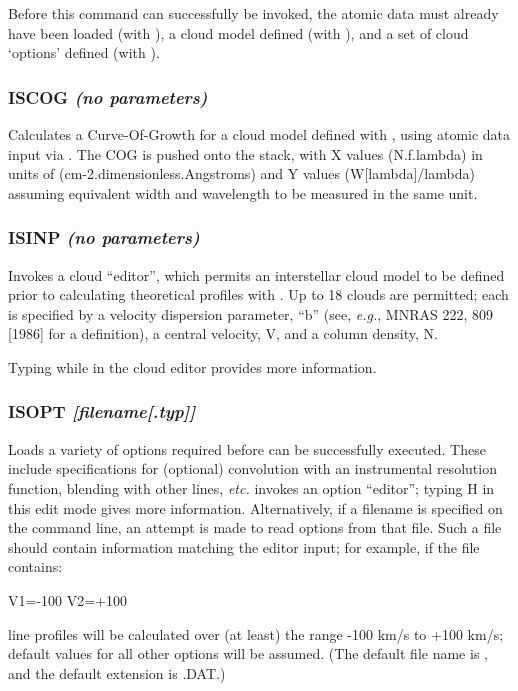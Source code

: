 \documentclass[twoside,11pt,noabs,nolof]{starlink}
\providecommand{\dipcom}[3]{\subsubsection*{\label{COM:#1}\textbf{#1} \emph{#2}}}
\begin{document}
Before this command can successfully be invoked, the atomic data must
already have been loaded (with ),  a cloud model defined (with
),  and a set of cloud `options' defined (with ).

\dipcom{ISCOG}{(no parameters)}{Calculates a Curve-Of-Growth for an interstellar cloud model}
Calculates a Curve-Of-Growth for a cloud model defined with ,
using atomic data input via .  The COG is pushed onto the stack,
with X values (N.f.lambda) in units of (cm-2.dimensionless.Angstroms)
and Y values (W[lambda]/lambda) assuming equivalent width and
wavelength to be measured in the same unit.

\dipcom{ISINP}{(no parameters)}{Sets up an interstellar cloud model}
Invokes a cloud ``editor'', which permits an interstellar cloud model
to be defined prior to calculating theoretical profiles with .
Up to 18 clouds are permitted; each is specified by a velocity
dispersion parameter, ``b'' (see, \emph{e.g.}, MNRAS 222, 809 [1986]
for a definition), a central velocity, V, and a column density, N.

Typing   while in the cloud editor provides more information.

\dipcom{ISOPT}{[filename[.typ]]}{Sets up options required by {\texttt{ISCALC}}}
Loads a variety of options required before   can be successfully
executed. These include specifications for (optional) convolution with
an instrumental resolution function, blending with other lines, \emph{etc.}   invokes an option ``editor''; typing H in this edit mode
gives more information. Alternatively, if a filename is specified on
the command line, an attempt is made to read options from that file.
Such a file should contain information matching the   editor
input; for example, if the file contains:

\begin{terminalv}
V1=-100
V2=+100
\end{terminalv}

line profiles will be calculated over (at least) the range -100 km/s
to +100 km/s; default values for all other options will be assumed.
(The default file name is ,  and the default extension is .DAT.)
\end{document}

